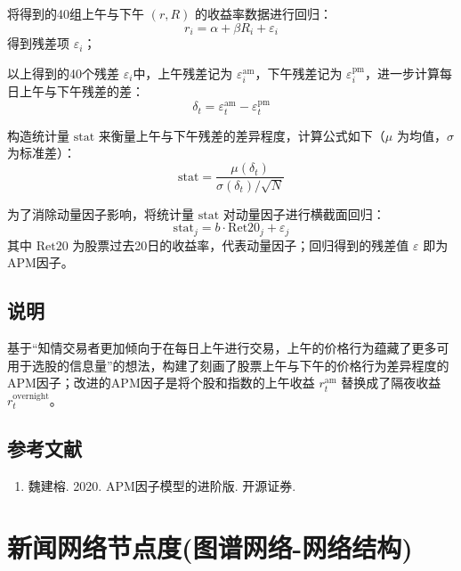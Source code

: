 \documentclass{article}
\begin{document}
将得到的40组上午与下午 \((r, R)\) 的收益率数据进行回归：
\begin{equation}
    r_i = \alpha + \beta R_i + \varepsilon_i
\end{equation}
得到残差项 \( \varepsilon_i \)；

以上得到的40个残差 \( \varepsilon_i \)中，上午残差记为 \( \varepsilon_i^{\mathrm{am}} \)，下午残差记为 \( \varepsilon_i^{\mathrm{pm}} \)，进一步计算每日上午与下午残差的差：
\begin{equation}
    \delta_t = \varepsilon_t^{\mathrm{am}} - \varepsilon_t^{\mathrm{pm}}
\end{equation}

构造统计量 \( \mathrm{stat} \) 来衡量上午与下午残差的差异程度，计算公式如下（\( \mu \) 为均值，\( \sigma \) 为标准差）：
\begin{equation}
    \mathrm{stat} = \frac{\mu(\delta_t)}{\sigma(\delta_t) / \sqrt{N}}
\end{equation}

为了消除动量因子影响，将统计量 \( \mathrm{stat} \) 对动量因子进行横截面回归：
\begin{equation}
    \mathrm{stat}_j = b \cdot \mathrm{Ret20}_j + \varepsilon_j
\end{equation}
其中 \( \mathrm{Ret20} \) 为股票过去20日的收益率，代表动量因子；回归得到的残差值 \( \varepsilon \) 即为APM因子。

\subsection{说明}
基于“知情交易者更加倾向于在每日上午进行交易，上午的价格行为蕴藏了更多可用于选股的信息量”的想法，构建了刻画了股票上午与下午的价格行为差异程度的APM因子；改进的APM因子是将个股和指数的上午收益 \( r_t^{\mathrm{am}} \) 替换成了隔夜收益 \( r_t^{\mathrm{overnight}} \)。

\subsection{参考文献}
\begin{enumerate}
    \item 魏建榕. 2020. APM因子模型的进阶版. 开源证券.
\end{enumerate}

\section{新闻网络节点度(图谱网络-网络结构)}
\end{document}
